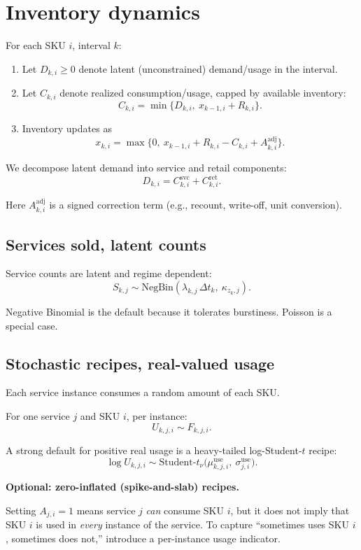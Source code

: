 \documentclass[11pt]{article}
\begin{document}
\section{Inventory dynamics}

For each SKU $i$, interval $k$:
\begin{enumerate}
  \item Let $D_{k,i}\ge 0$ denote latent (unconstrained) demand/usage in the interval.
  \item Let $C_{k,i}$ denote realized consumption/usage, capped by available inventory:
  \[
    C_{k,i} = \min\bigl\{D_{k,i},\ x_{k-1,i} + R_{k,i}\bigr\}.
  \]
  \item Inventory updates as
  \[
    x_{k,i} = \max\bigl\{0,\ x_{k-1,i} + R_{k,i} - C_{k,i} + A^{\mathrm{adj}}_{k,i}\bigr\}.
  \]
\end{enumerate}

We decompose latent demand into service and retail components:
\[
  D_{k,i} = C^{\mathrm{svc}}_{k,i} + C^{\mathrm{ret}}_{k,i}.
\]

Here $A^{\mathrm{adj}}_{k,i}$ is a signed correction term (e.g., recount, write-off, unit conversion).

\subsection{Services sold, latent counts}

Service counts are latent and regime dependent:
\[
  S_{k,j} \sim \text{NegBin}(\lambda_{k,j}\,\Delta t_k,\ \kappa_{z_k,j}).
\]

Negative Binomial is the default because it tolerates burstiness. Poisson is a special case.

\subsection{Stochastic recipes, real-valued usage}

Each service instance consumes a random amount of each SKU.

For one service $j$ and SKU $i$, per instance:
\[
  U_{k,j,i} \sim F_{k,j,i}.
\]

A strong default for positive real usage is a heavy-tailed log-Student-$t$ recipe:
\[
  \log U_{k,j,i} \sim \text{Student-}t_{\nu}\bigl(\mu^{\mathrm{use}}_{k,j,i},\ \sigma^{\mathrm{use}}_{j,i}\bigr).
\]

\textbf{Optional: zero-inflated (spike-and-slab) recipes.}

Setting $A_{j,i}=1$ means service $j$ \emph{can} consume SKU $i$, but it does not imply that SKU $i$ is used in \emph{every} instance of the service.
To capture ``sometimes uses SKU $i$, sometimes does not,'' introduce a per-instance usage indicator.
\end{document}
